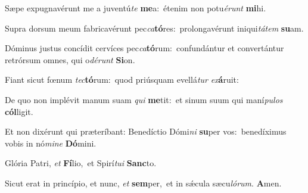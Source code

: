 Sæpe expugnavérunt me a juventú\textit{te} \textbf{me}a:~\redgreheightstar étenim non potu\textit{é}\textit{runt} \textbf{mi}hi.

Supra dorsum meum fabricavérunt pec\textit{ca}\textbf{tó}res:~\redgreheightstar prolongavérunt iniqui\textit{tá}\textit{tem} \textbf{su}am.

Dóminus justus concídit cervíces pec\textit{ca}\textbf{tó}rum:~\redgreheightstar confundántur et convertántur retrórsum omnes, qui o\textit{dé}\textit{runt} \textbf{Si}on.

Fiant sicut fœnum \textit{tec}\textbf{tó}rum:~\redgreheightstar quod priúsquam evellá\textit{tur} \textit{ex}\textbf{á}ruit:

De quo non implévit manum suam \textit{qui} \textbf{me}tit:~\redgreheightstar et sinum suum qui maní\textit{pu}\textit{los} \textbf{cól}ligit.

Et non dixérunt qui præteríbant: Benedíctio Dómi\textit{ni} \textbf{su}per vos:~\redgreheightstar benedíximus vobis in nó\textit{mi}\textit{ne} \textbf{Dó}mini.

Glória Patri, \textit{et} \textbf{Fí}lio,~\redgreheightstar et Spirí\textit{tu}\textit{i} \textbf{Sanc}to.

Sicut erat in princípio, et nunc, \textit{et} \textbf{sem}per,~\redgreheightstar et in sǽcula sæcu\textit{ló}\textit{rum}. \textbf{A}men.


